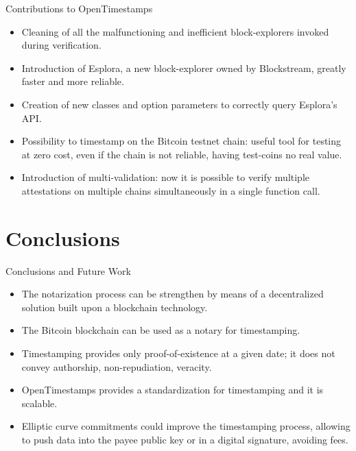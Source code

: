 \documentclass[usenames,dvipsnames]{beamer}
\begin{document}
    \begin{frame}{Contributions to OpenTimestamps}
        \begin{itemize}
            \item Cleaning of all the \alert{malfunctioning} and \alert{inefficient block-explorers} invoked during verification.
            \item Introduction of \alert{Esplora}, a new block-explorer owned by Blockstream, greatly \alert{faster} and \alert{more reliable}.
            \item Creation of \alert{new classes} and \alert{option parameters} to correctly query Esplora's API.
            \item Possibility to \alert{timestamp} on the \alert{Bitcoin testnet} chain: useful tool for \alert{testing} at \alert{zero cost}, even if the chain is not reliable, having test-coins no real value.
            \item Introduction of \alert{multi-validation}: now it is possible to verify \alert{multiple attestations} on \alert{multiple chains} simultaneously in a single function call. 
        \end{itemize}
    \end{frame}
    
     
    
    \section{Conclusions}
     \begin{frame}{Conclusions and Future Work}\label{lastframe}
      \begin{itemize}
          \item The \alert{notarization} process can be strengthen by means of a \alert{decentralized solution} built upon a \alert{blockchain technology}.
          \item The \alert{Bitcoin blockchain} can be used as a \alert{notary} for timestamping.
          \item \alert{Timestamping} provides only \alert{proof-of-existence} at a given date; it does not convey authorship, non-repudiation, veracity.
          \item OpenTimestamps provides a \alert{standardization} for timestamping and it is \alert{scalable}.
          \item \alert{Elliptic curve commitments} could improve the timestamping process, allowing to push data into the payee public key or in a digital signature, \alert{avoiding fees}.
      \end{itemize}
    \end{frame}
    
\end{document}
